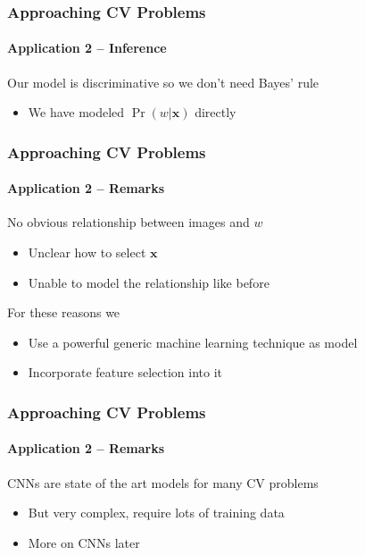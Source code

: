 \documentclass[xetex,professionalfont]{beamer}
\renewcommand{\vec}[1]{\ensuremath{\mathbf{#1}}}
\newcommand{\vx}{\vec{x}}
\begin{document}

\begin{frame}
\frametitle{Approaching CV Problems}
\framesubtitle{Application 2 -- Inference}

Our model is discriminative so we don't need Bayes' rule
\begin{itemize}
    \item We have modeled $\Pr(w|\vx)$ directly
\end{itemize}

\end{frame}


\begin{frame}
\frametitle{Approaching CV Problems}
\framesubtitle{Application 2 -- Remarks}

No obvious relationship between images and $w$
\begin{itemize}
    \item Unclear how to select $\vx$
    \item Unable to model the relationship like before
\end{itemize}

\bigskip
For these reasons we
\begin{itemize}
    \item Use a powerful generic machine learning technique as model
    \item Incorporate feature selection into it
\end{itemize}

\end{frame}


\begin{frame}
\frametitle{Approaching CV Problems}
\framesubtitle{Application 2 -- Remarks}

CNNs are state of the art models for many CV problems
\begin{itemize}
    \item But very complex, require lots of training data
    \item More on CNNs later
\end{itemize}

\end{frame}

\end{document}
